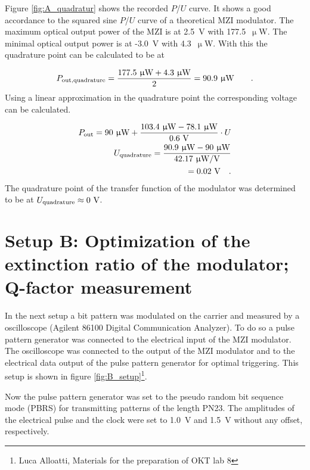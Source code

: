 Figure \ref{fig:A_quadratur} shows the recorded $P$/$U$ curve. It shows a good accordance to the squared sine $P$/$U$ curve of a theoretical MZI modulator.
The maximum optical output power of the MZI is at 2.5~V with 177.5~$\upmu$W. The minimal optical output power is at -3.0~V with 4.3~$\upmu$W. With this the quadrature point can be calculated to be at

\begin{equation}
P_{\mathrm{out,quadrature}}=\frac{177.5~\upmu \mathrm{W}+4.3~\upmu \mathrm{W}}{2}=90.9~\upmu \mathrm{W}\qquad.
\label{eq:}
\end{equation} 
Using a linear approximation in the quadrature point the corresponding voltage can be calculated.

\begin{equation}
\begin{split}
P_{\mathrm{out}}=90~\upmu \mathrm{W} + \frac{103.4~\upmu \mathrm{W}- 78.1~\upmu \mathrm{W}}{0.6~\mathrm{V}}\cdot U\\
U_{\mathrm{quadrature}}=\frac{90.9~\upmu \mathrm{W}-90~\upmu \mathrm{W}}{42.17~\upmu \mathrm{W}/\mathrm{V}}\\
=0.02~\mathrm{V} \quad.
\end{split}
\label{eq:}
\end{equation}
The quadrature point of the transfer function of the modulator was determined to be at $U_{\mathrm{quadrature}}\approx 0~\mathrm{V}$.


\section{Setup B: Optimization of the extinction ratio of the modulator; Q-factor measurement}





In the next setup a bit pattern was modulated on the carrier and measured by a oscilloscope (Agilent 86100 Digital Communication Analyzer). To do so a pulse pattern generator was connected to the electrical input of the MZI modulator. The oscilloscope was connected to the output of the MZI modulator and to the electrical data output of the pulse pattern generator for optimal triggering. This setup is shown in figure \ref{fig:B_setup}\footnote[3]{Luca Alloatti, Materials for the preparation of OKT lab 8}.

Now the pulse pattern generator was set to the pseudo random bit sequence mode (PBRS) for transmitting patterns of the length PN23. The amplitudes of the electrical pulse and the clock were set to 1.0~V and 1.5~V without any offset, respectively.


